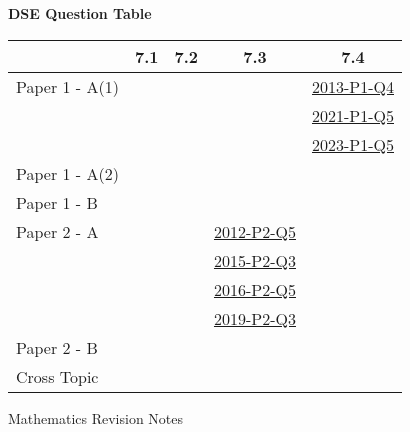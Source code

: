 \documentclass[12pt, a4paper]{article}
\begin{document}
\begin{absolutelynopagebreak}
\begin{center}
\textbf{DSE Question Table}
\end{center}
\begin{center}
\begin{tabular}{|l|c|c|c|c|}
\hline
        & 7.1 & 7.2 & 7.3 & 7.4 \\\hline
\hline
Paper 1 - A(1)&  &  &  & \hyperref[DSE2013-CoreP1-Q04]{2013-P1-Q4} \\
&  &  &  & \hyperref[DSE2021-CoreP1-Q05]{2021-P1-Q5} \\
&  &  &  & \hyperref[DSE2023-CoreP1-Q05]{2023-P1-Q5} \\
\hline
Paper 1 - A(2)&  &  &  &  \\
\hline
Paper 1 - B&  &  &  &  \\
\hline
\hline
Paper 2 - A&  &  & \hyperref[DSE2012-CoreP2-Q05]{2012-P2-Q5} &  \\
&  &  & \hyperref[DSE2015-CoreP2-Q03]{2015-P2-Q3} &  \\
&  &  & \hyperref[DSE2016-CoreP2-Q05]{2016-P2-Q5} &  \\
&  &  & \hyperref[DSE2019-CoreP2-Q03]{2019-P2-Q3} &  \\
\hline
Paper 2 - B&  &  &  &  \\
\hline
\hline
Cross Topic&  &  &  &  \\
\hline
\end{tabular}
\end{center}
\end{absolutelynopagebreak}
\newpage
\newpage
\thispagestyle{empty}
\begin{center}
Mathematics Revision Notes\\\vspace{1cm}
\\\vspace{1cm}
{\fontsize{24pt}{24pt}\selectfont {Laws of Integral Indices}} \\\vspace{1cm}
\label{chapter:S2-8}

\end{center}
\vspace{0.5cm}
\hline
\end{document}
